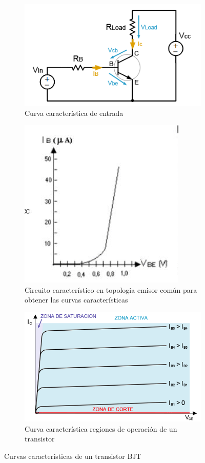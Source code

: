 \begin{figure}[h!]
	\begin{subfigure}{0.4\linewidth}
		\includegraphics[scale=0.5]{curva_entrada_bjt}
		\caption{Curva característica de entrada}
		\label {fig:circ_pol_bjt}
	\end{subfigure}
	\begin{subfigure}{0.4\linewidth}
		\includegraphics[scale=0.5]{curva_entrada_bjt_1}
		\caption{Circuito característico en topologia emisor común para obtener las curvas características}
		\label{fig:ib_vs_vbe}
	\end{subfigure}
	\hspace{50cm}
	\begin{subfigure}{0.4\linewidth}
		\includegraphics[scale=0.5]{Curva_ic_vs_vce}
		\caption{Curva característica regiones de operación de un transistor}
		
		\label{fig:Ic_vs_vce}
	\end{subfigure}
\caption{Curvas características de un transistor BJT}
\label{fig:curvas_bjt}
\end{figure}

